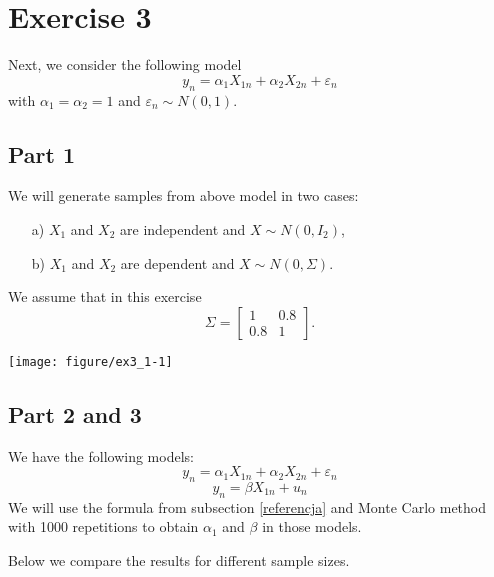 \documentclass[12pt, a4paper]{article}\usepackage[]{graphicx}\usepackage[]{color}
\makeatletter
\def\maxwidth{ %
  \ifdim\Gin@nat@width>\linewidth
    \linewidth
  \else
    \Gin@nat@width
  \fi
}
\makeatother
\begin{document}

\section{Exercise 3}



Next, we consider the following model
\[y_{n} = \alpha_{1}X_{1n}+\alpha_{2}X_{2n}+\varepsilon_{n}\]
with $\alpha_{1} = \alpha_{2} = 1$ and $\varepsilon_{n}\sim N(0,1)$.



\subsection{Part 1}
We will generate samples from above model in two cases:
\begin{enumerate}
\item[a)] $X_{1}$ and $X_{2}$ are independent and $X \sim N(0,I_{2})$,
\item[b)] $X_{1}$ and $X_{2}$ are dependent and $X \sim N(0,\Sigma)$.
\end{enumerate}
We assume that in this exercise 
\[
  \Sigma = 
  \begin{bmatrix}  
      1 & 0.8 \\ 
      0.8 & 1
  \end{bmatrix}.
\]


{\centering \texttt{[image: figure/ex3\_1-1]} 

}






\subsection{Part 2 and 3}
We have the following models: 
\[ y_{n} = \alpha_{1}X_{1n}+\alpha_{2}X_{2n}+\varepsilon_{n} \]
\[ y_{n} = \beta X_{1n}+u_{n} \]
We will use the formula from subsection \ref{referencja} and Monte Carlo method with 1000 repetitions to obtain $\alpha_{1}$ and $\beta$ in those models.

Below we compare the results for different sample sizes.
\end{document}

